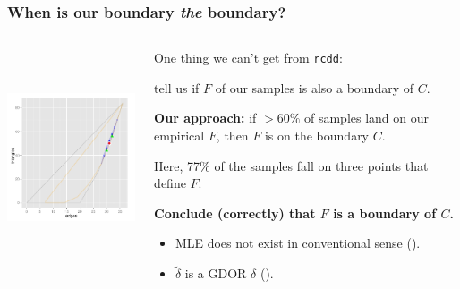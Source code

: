 \documentclass[ 10pt]{beamer}
\begin{document}
\frame
{
\frametitle{When is our boundary \emph{the} boundary?}  

\begin{columns}[T]
\begin{column}[T]{0.25\textwidth}
\includegraphics[height=2.5in,trim=3.5in 2in 0.15in 0.05in,clip=true]{MCsample-77face} %
\end{column}

\begin{column}[T]{0.75\textwidth}
One thing we can't get from \texttt{rcdd}: 

tell us if $F$ of our samples is also a boundary of $C$.  
\vspace{2mm}

\textbf{Our approach:} if $>60\%$ of samples land on our empirical $F$, then $F$ is on the boundary $C$.
\vspace{4mm}

\pause
Here, 77\% of the samples fall on three points that define $F$.  
\vspace{2mm}

\textbf{Conclude (correctly) that $F$ is a boundary of $C$.}
\begin{itemize}
\item MLE does not exist in conventional sense (\alert{\checkmark}).
\item $\tilde{\delta}$ is a GDOR $\delta$ (\alert{\checkmark}).
\end{itemize}
\end{column}
\end{columns}
}
\end{document}
